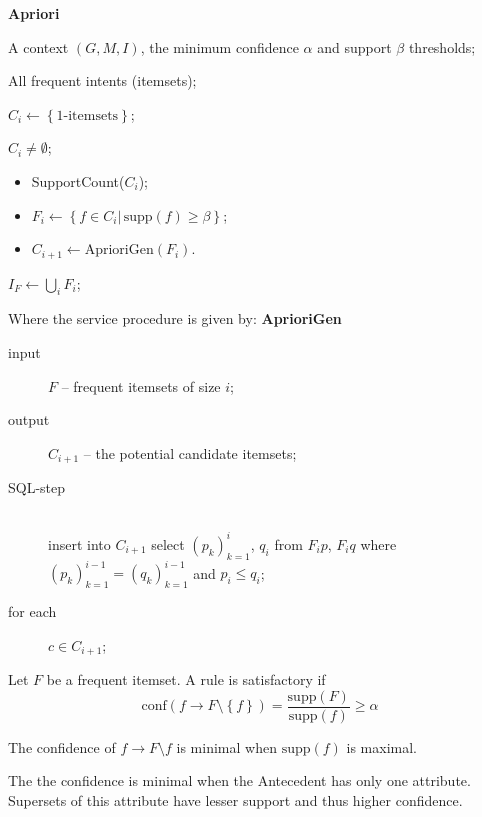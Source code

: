 \documentclass[a4paper]{article}
\newcommand{\obj}[1]{{\left\{ #1 \right \}}}
\newcommand{\brac}[1]{{\left ( #1 \right )}}
\newcommand{\induc}[1]{{\left . #1 \right \vert}}
\begin{document}
\textbf{Apriori}
\begin{description}
	\item[input] A context $\brac{G,M,I}$, the minimum confidence $\alpha$ and support $\beta$ thresholds;
	\item[output] All frequent intents (itemsets);
	\item $C_i\leftarrow \obj{\text{1-itemsets}}$;
	\item[while] $C_i\neq \emptyset$;\begin{itemize}
		\item SupportCount($C_i$);
		\item $F_i \leftarrow \obj{\induc{f\in C_i}\,\text{supp}(f)\geq \beta}$;
		\item $C_{i+1}\leftarrow \text{AprioriGen}\brac{F_i}$.
	\end{itemize}
	\item[Finalization] $I_F \leftarrow \bigcup_i F_i$;
\end{description}

Where the service procedure is given by:
\textbf{AprioriGen}
\begin{description}
	\item[input] $F$ -- frequent itemsets of size $i$;
	\item[output] $C_{i+1}$ -- the potential candidate itemsets;
	\item[SQL-step]\hfill\\
		insert into $C_{i+1}$ select $\brac{p_k}_{k=1}^i$, $q_i$ from $F_ip$, $F_iq$ where $\brac{p_k}_{k=1}^{i-1} = \brac{q_k}_{k=1}^{i-1}$ and $p_i\leq q_i$;
	\item[for each] $c\in C_{i+1}$;
\end{description}

Let $F$ be a frequent itemset. A rule is satisfactory if 
\[\text{conf}(f\to F\setminus \obj{f}) = \frac{\text{supp}(F)}{\text{supp}(f)} \geq \alpha\]

The confidence of $f\to F\setminus f$ is minimal when $\text{supp}(f)$ is maximal.

The the confidence is minimal when the Antecedent has only one attribute. Supersets of this attribute have lesser support and thus higher confidence.
\end{document}
